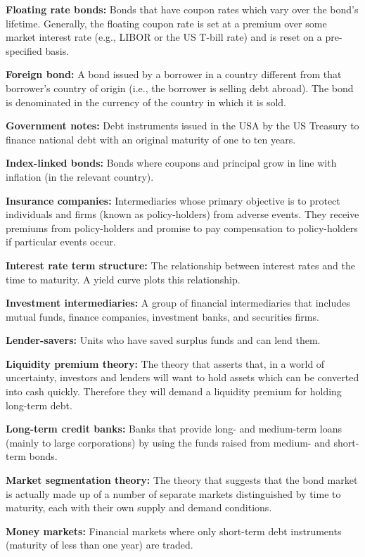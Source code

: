 \documentclass[twoside,openany]{book}
\begin{document}
\textbf{Floating rate bonds:} Bonds that have coupon rates which vary over the bond's lifetime. Generally, the floating coupon rate is set at a premium over some market interest rate (e.g., LIBOR or the US T-bill rate) and is reset on a pre-specified basis.

\textbf{Foreign bond:} A bond issued by a borrower in a country different from that borrower's country of origin (i.e., the borrower is selling debt abroad). The bond is denominated in the currency of the country in which it is sold.

\textbf{Government notes:} Debt instruments issued in the USA by the US Treasury to finance national debt with an original maturity of one to ten years.

\textbf{Index-linked bonds:} Bonds where coupons and principal grow in line with inflation (in the relevant country).

\textbf{Insurance companies:} Intermediaries whose primary objective is to protect individuals and firms (known as policy-holders) from adverse events. They receive premiums from policy-holders and promise to pay compensation to policy-holders if particular events occur.

\textbf{Interest rate term structure:} The relationship between interest rates and the time to maturity. A yield curve plots this relationship.

\textbf{Investment intermediaries:} A group of financial intermediaries that includes mutual funds, finance companies, investment banks, and securities firms.

\textbf{Lender-savers:} Units who have saved surplus funds and can lend them.

\textbf{Liquidity premium theory:} The theory that asserts that, in a world of uncertainty, investors and lenders will want to hold assets which can be converted into cash quickly. Therefore they will demand a liquidity premium for holding long-term debt.

\textbf{Long-term credit banks:} Banks that provide long- and medium-term loans (mainly to large corporations) by using the funds raised from medium- and short-term bonds.

\textbf{Market segmentation theory:} The theory that suggests that the bond market is actually made up of a number of separate markets distinguished by time to maturity, each with their own supply and demand conditions.

\textbf{Money markets:} Financial markets where only short-term debt instruments (maturity of less than one year) are traded.
\end{document}
